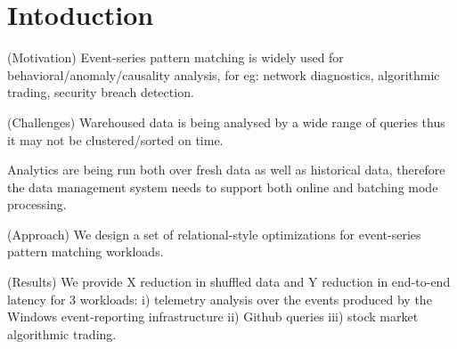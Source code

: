 \section{Intoduction}

(Motivation) 
Event-series pattern matching is widely used for behavioral/anomaly/causality
analysis, for eg: network diagnostics, algorithmic
trading, security breach detection.


(Challenges)
Warehoused data is being analysed by a wide range of queries thus it
may not be clustered/sorted on time. 

Analytics are being run both over fresh data as well as historical data,
therefore the data management system needs to support both online and
batching mode processing.


(Approach)
We design a set of relational-style optimizations for event-series pattern
matching workloads.

(Results)
We provide X reduction in shuffled data and Y reduction in end-to-end latency
for 3 workloads:
i) telemetry analysis over the events produced by the Windows event-reporting
infrastructure
ii) Github queries
iii) stock market algorithmic trading.



 


